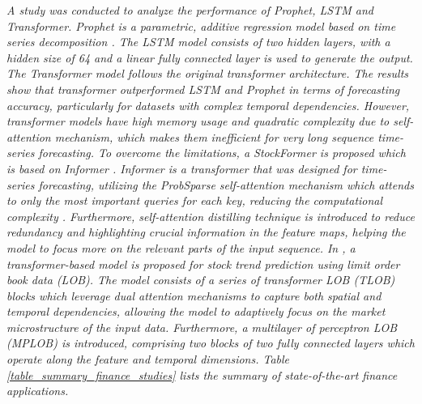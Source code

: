 \documentclass[preprint,12pt]{elsarticle}
\begin{document}
\emph{A study was conducted to analyze the performance of Prophet, LSTM and Transformer. Prophet is a parametric, additive regression model based on time series decomposition \citep{mozaffari_predictive_2024}. The LSTM model consists of two hidden layers, with a hidden size of 64 and a linear fully connected layer is used to generate the output. The Transformer model follows the original transformer architecture. The results show that transformer outperformed LSTM and Prophet in terms of forecasting accuracy, particularly for datasets with complex temporal dependencies. However, transformer models have high memory usage and quadratic complexity due to self-attention mechanism, which makes them inefficient for very long sequence time-series forecasting. To overcome the limitations, a StockFormer is proposed which is based on Informer \citep{li_transformer_2025}. Informer is a transformer that was designed for time-series forecasting, utilizing the ProbSparse self-attention mechanism which attends to only the most important queries for each key, reducing the computational complexity \citep{zhou_informer_2021}. Furthermore, self-attention distilling technique is introduced to reduce redundancy and highlighting crucial information in the feature maps, helping the model to focus more on the relevant parts of the input sequence. In \citep{berti_tlob_2025}, a transformer-based model is proposed for stock trend prediction using limit order book data (LOB). The model consists of a series of transformer LOB (TLOB) blocks which leverage dual attention mechanisms to capture both spatial and temporal dependencies, allowing the model to adaptively focus on the market microstructure of the input data. Furthermore, a multilayer of perceptron LOB (MPLOB) is introduced, comprising two blocks of two fully connected layers which operate along the feature and temporal dimensions. Table \ref{table_summary_finance_studies} lists the summary of state-of-the-art finance applications.}
\end{document}
